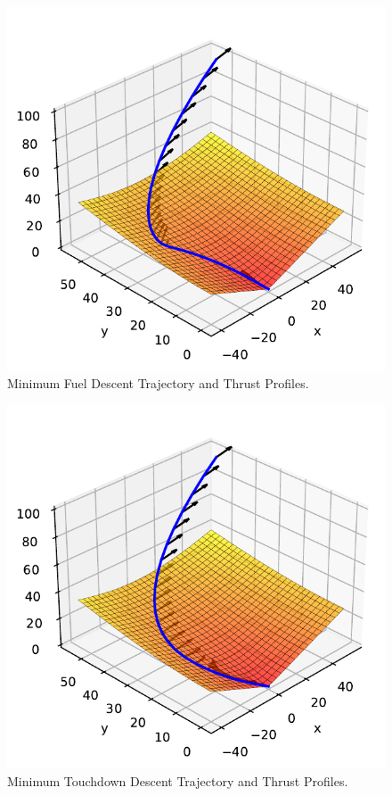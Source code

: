 \documentclass[12pt,reqno]{article}
\theoremstyle{definition}
\numberwithin{equation}{section}
\begin{document}
    \begin{figure}[htbp]
        \centering
        \includegraphics[width=\linewidth]{../examples/364a/rocket_min_fuel.pdf}
        \caption{Minimum Fuel Descent Trajectory and Thrust Profiles.}
        \label{fig:364a-min-fuel-desc}
    \end{figure}


    \begin{figure}[htbp]
        \centering
        \includegraphics[width=\linewidth]{../examples/364a/rocket_min_descent.pdf}
        \caption{Minimum Touchdown Descent Trajectory and Thrust Profiles.}
        \label{fig:364a-min-touchdown-desc}
    \end{figure}

\newpage

\printbibliography
\end{document}
